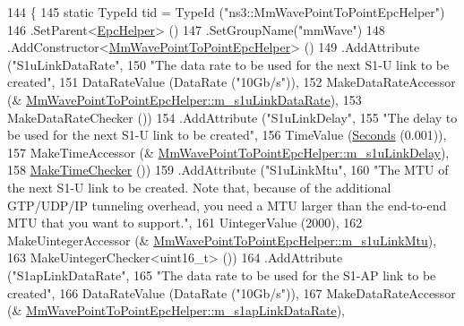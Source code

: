 \begin{DoxyCode}
144 \{
145   \textcolor{keyword}{static} TypeId tid = TypeId (\textcolor{stringliteral}{"ns3::MmWavePointToPointEpcHelper"})
146     .SetParent<\hyperlink{classns3_1_1EpcHelper_a419929e12a2c6273eb48cb766064436b}{EpcHelper}> ()
147     .SetGroupName(\textcolor{stringliteral}{"mmWave"})
148     .AddConstructor<\hyperlink{classns3_1_1MmWavePointToPointEpcHelper_a45b842e4b0bda8e4df3a3826c0b945b3}{MmWavePointToPointEpcHelper}> ()
149     .AddAttribute (\textcolor{stringliteral}{"S1uLinkDataRate"}, 
150                    \textcolor{stringliteral}{"The data rate to be used for the next S1-U link to be created"},
151                    DataRateValue (DataRate (\textcolor{stringliteral}{"10Gb/s"})),
152                    MakeDataRateAccessor (&
      \hyperlink{classns3_1_1MmWavePointToPointEpcHelper_a6350505bc847c3c88cd0cb44de1809f7}{MmWavePointToPointEpcHelper::m\_s1uLinkDataRate}),
153                    MakeDataRateChecker ())
154     .AddAttribute (\textcolor{stringliteral}{"S1uLinkDelay"}, 
155                    \textcolor{stringliteral}{"The delay to be used for the next S1-U link to be created"},
156                    TimeValue (\hyperlink{group__timecivil_ga33c34b816f8ff6628e33d5c8e9713b9e}{Seconds} (0.001)),
157                    MakeTimeAccessor (&
      \hyperlink{classns3_1_1MmWavePointToPointEpcHelper_ac3ac70052255531fa75d5cd0b716d54b}{MmWavePointToPointEpcHelper::m\_s1uLinkDelay}),
158                    \hyperlink{group__time_ga7032965bd4afa578691d88c09e4481c1}{MakeTimeChecker} ())
159     .AddAttribute (\textcolor{stringliteral}{"S1uLinkMtu"}, 
160                    \textcolor{stringliteral}{"The MTU of the next S1-U link to be created. Note that, because of the additional
       GTP/UDP/IP tunneling overhead, you need a MTU larger than the end-to-end MTU that you want to support."},
161                    UintegerValue (2000),
162                    MakeUintegerAccessor (&
      \hyperlink{classns3_1_1MmWavePointToPointEpcHelper_a3caa07a7eb4129570763154b1d6c2630}{MmWavePointToPointEpcHelper::m\_s1uLinkMtu}),
163                    MakeUintegerChecker<uint16\_t> ())
164     .AddAttribute (\textcolor{stringliteral}{"S1apLinkDataRate"}, 
165                    \textcolor{stringliteral}{"The data rate to be used for the S1-AP link to be created"},
166                    DataRateValue (DataRate (\textcolor{stringliteral}{"10Gb/s"})),
167                    MakeDataRateAccessor (&
      \hyperlink{classns3_1_1MmWavePointToPointEpcHelper_a44dd93ffe2c0e326f3fd61e132c59f24}{MmWavePointToPointEpcHelper::m\_s1apLinkDataRate}),

\end{DoxyCode}
